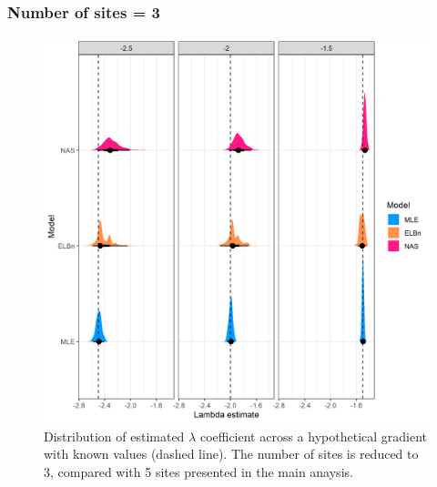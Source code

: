 \documentclass[
]{article}
\begin{document}
\newpage

\hypertarget{number-of-sites-3}{%
\subsubsection{Number of sites = 3}\label{number-of-sites-3}}

\begin{figure}
\centering
\includegraphics{figures/PLB_3_sites_est_b_density.png}
\caption{Distribution of estimated \(\lambda\) coefficient across a
hypothetical gradient with known values (dashed line). The number of
sites is reduced to 3, compared with 5 sites presented in the main
anaysis.}
\end{figure}

\newpage
\end{document}
